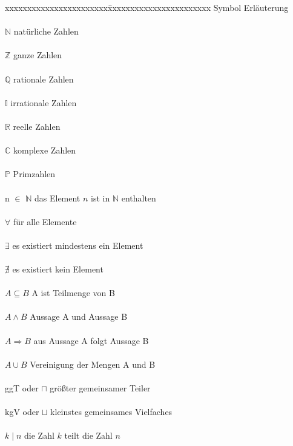 \documentclass[12pt,a4paper]{article}
\theoremstyle{definition}
\begin{document}
\begin{tabbing}
xxxxxxxxxxxxxxxxxxxxxxx\=xxxxxxxxxxxxxxxxxxxxxxx\kill
\large Symbol             \> \large Erläuterung\\
\\$\mathbb{N}$            \> natürliche Zahlen\\
\\$\mathbb{Z}$            \> ganze Zahlen\\
\\$\mathbb{Q}$            \> rationale Zahlen\\
\\$\mathbb{I}$            \> irrationale Zahlen\\
\\$\mathbb{R}$            \> reelle Zahlen\\
\\$\mathbb{C}$            \> komplexe Zahlen\\
\\$\mathbb{P}$            \> Primzahlen\\
\\n $\in$ $\mathbb{N}$    \> das Element $n$ ist in $\mathbb{N}$ enthalten\\
\\$\forall$               \> für alle Elemente\\
\\$\exists$               \> es existiert mindestens ein Element\\
\\$\nexists$              \> es existiert kein Element\\
\\$A \subseteq B$         \> A ist Teilmenge von B\\
\\$A \land B $            \> Aussage A und Aussage B\\
\\$A \Rightarrow B $      \> aus Aussage A folgt Aussage B\\
\\$A \cup B$              \> Vereinigung der Mengen A und B\\
\\ggT  oder $\sqcap$      \> größter gemeinsamer Teiler\\
\\kgV  oder $\sqcup$      \> kleinstes gemeinsames Vielfaches\\
\\$k \mid n$              \> die Zahl $k$ teilt die Zahl $n$\\

\end{tabbing}
\end{document}
